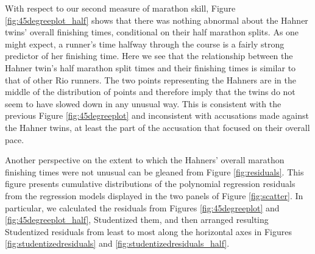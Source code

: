 \documentclass[12pt,titlepage]{article}
\begin{document}
With respect to our second measure of marathon skill, Figure
\ref{fig:45degreeplot_half} shows that there was nothing abnormal
about the Hahner twins' overall finishing times, conditional on their
half marathon splits. As one might expect, a runner's time halfway
through the course is a fairly strong predictor of her finishing time.
Here we see that the relationship between the Hahner twin's half
marathon split times and their finishing times is similar to that of
other Rio runners.  The two points representing the Hahners are in the
middle of the distribution of points and therefore imply that the
twins do not seem to have slowed down in any unusual way.  This is
consistent with the previous Figure \ref{fig:45degreeplot} and
inconsistent with accusations made against the Hahner twins, at least
the part of the accusation that focused on their overall pace.

Another perspective on the extent to which the Hahners' overall
marathon finishing times were not unusual can be gleaned from Figure
\ref{fig:residuals}.  This figure presents cumulative distributions of
the polynomial regression residuals from the regression models
displayed in the two panels of Figure \ref{fig:scatter}.  In
particular, we calculated the residuals from Figures
\ref{fig:45degreeplot} and \ref{fig:45degreeplot_half}, Studentized
them, and then arranged resulting Studentized residuals from least to
most along the horizontal axes in Figures
\ref{fig:studentizedresiduals} and \ref{fig:studentizedresiduals_half}.
\end{document}
